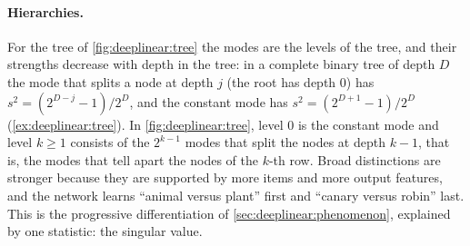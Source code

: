 \begin{refsection}
\paragraph{Hierarchies.} For the tree of \cref{fig:deeplinear:tree} the modes are the levels of the tree, and their strengths decrease with depth in the tree: in a complete binary tree of depth $D$ the mode that splits a node at depth $j$ (the root has depth $0$) has $s^2=(2^{D-j}-1)/2^D$, and the constant mode has $s^2=(2^{D+1}-1)/2^D$ (\cref{ex:deeplinear:tree}). In \cref{fig:deeplinear:tree}, level $0$ is the constant mode and level $k\ge1$ consists of the $2^{k-1}$ modes that split the nodes at depth $k-1$, that is, the modes that tell apart the nodes of the $k$-th row. Broad distinctions are stronger because they are supported by more items and more output features, and the network learns ``animal versus plant'' first and ``canary versus robin'' last. This is the progressive differentiation of \cref{sec:deeplinear:phenomenon}, explained by one statistic: the singular value.


\end{refsection}

